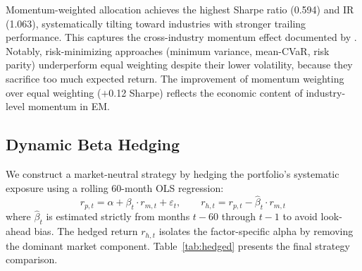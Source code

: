 \documentclass[12pt]{article}
\begin{document}
Momentum-weighted allocation achieves the highest Sharpe ratio (0.594) and IR (1.063), systematically tilting toward industries with stronger trailing performance. This captures the cross-industry momentum effect documented by \citet{asness2013}. Notably, risk-minimizing approaches (minimum variance, mean-CVaR, risk parity) underperform equal weighting despite their lower volatility, because they sacrifice too much expected return. The improvement of momentum weighting over equal weighting ($+$0.12 Sharpe) reflects the economic content of industry-level momentum in EM.

\subsection{Dynamic Beta Hedging}

We construct a market-neutral strategy by hedging the portfolio's systematic exposure using a rolling 60-month OLS regression:
\begin{equation}
r_{p,t} = \alpha + \beta_t \cdot r_{m,t} + \varepsilon_t, \quad\quad r_{h,t} = r_{p,t} - \hat{\beta}_t \cdot r_{m,t}
\end{equation}
where $\hat{\beta}_t$ is estimated strictly from months $t{-}60$ through $t{-}1$ to avoid look-ahead bias. The hedged return $r_{h,t}$ isolates the factor-specific alpha by removing the dominant market component. Table~\ref{tab:hedged} presents the final strategy comparison.
\end{document}
